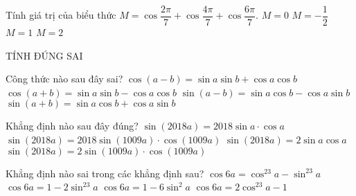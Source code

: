 \begin{ex}%
Tính giá trị của biểu thức $M=\cos \dfrac{{2\pi}}{7}+\cos \dfrac{{4\pi}}{7}+\cos \dfrac{{6\pi}}{7}.$
\choice
{$M=0$}
{\True $M=-\dfrac{1}{2}$}
{$M=1$}
{$M=2$}
 \end{ex}

\begin{dang}
    {TÍNH ĐÚNG SAI}
\end{dang}

\begin{ex}%
Công thức nào sau đây sai?
\choice
{$\cos \left({a-b}\right)=\sin a\sin b+\cos a\cos b$}
{\True $\cos \left({a+b}\right)=\sin a\sin b-\cos a\cos b$}
{$\sin \left({a-b}\right)=\sin a\cos b-\cos a\sin b$}
{$\sin \left({a+b}\right)=\sin a\cos b+\cos a\sin b$}
\end{ex}

\begin{ex}%
Khẳng định nào sau đây đúng?
\choice
{$\sin \left({2018a}\right)=2018\sin a\cdot\cos a$}
{$\sin \left({2018a}\right)=2018\sin \left({1009a}\right)\cdot\cos \left({1009a}\right)$}
{$\sin \left({2018a}\right)=2\sin a\cos a$}
{\True $\sin \left({2018a}\right)=2\sin \left({1009a}\right)\cdot\cos \left({1009a}\right)$}
\end{ex}

\begin{ex}%
Khẳng định nào sai trong các khẳng định sau?
\choice
{$\cos 6a=\cos ^23a-\sin ^23a$}
{$\cos 6a=1-2\sin ^23a$}
{\True $\cos 6a=1-6\sin ^2a$}
{$\cos 6a=2\cos ^23a-1$}
 \end{ex}

